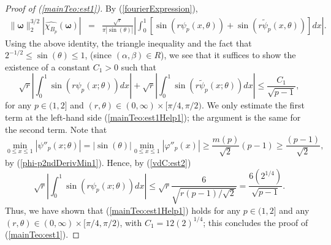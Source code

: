 \documentclass{amsart}
\numberwithin{equation}{section}
\begin{document}
\begin{proof}[Proof of (\ref{mainTeo:est1})] 
By (\ref{fourierExpression}),
\begin{eqnarray}
\nonumber
\|\boldsymbol{\omega}\|_2^{3/2}|\widehat{\chi_{B_p}}(\boldsymbol{\omega})|&=&\frac{\sqrt{r}}{\pi|\sin(\theta)|}\left|\int_0^1 \left[\sin(r\psi_p(x,\theta))+\sin(r\widetilde{\psi}_p(x,\theta))\right]dx\right|.
\end{eqnarray}
Using the above identity, the triangle inequality and the fact that $2^{-1/2}\le\sin(\theta)\le1$, (since $(\alpha,\beta)\in R$), we see that it suffices to show the existence of a constant $C_1>0$ such that
\begin{equation}
    \label{mainTeo:est1Help1}
    \sqrt{r}\left|\int_0^1\sin(r\psi_p(x;\theta))dx\right|+\sqrt{r}\left|\int_0^1\sin(r\widetilde{\psi}_p(x;\theta))dx\right|\le\frac{C_1}{\sqrt{p-1}},
\end{equation}
for any $p\in(1,2]$ and  $(r,\theta)\in(0,\infty)\times[\pi/4,\pi/2)$. We only estimate the first term at the left-hand side (\ref{mainTeo:est1Help1}); the argument is the same for the second term. Note that
$$
\min_{0\le x\le1}|\psi''_p(x;\theta)|=|\sin(\theta)|\min_{0\le x\le1}|\varphi''_p(x)|\ge\frac{m(p)}{\sqrt{2}}(p-1)\ge\frac{(p-1)}{\sqrt{2}},
$$
by (\ref{phi-p2ndDerivMin1}). Hence, by (\ref{vdC:est2})
$$
\sqrt{r}\left|\int_0^1\sin(r\psi_p(x;\theta))dx\right|\le\sqrt{r}\frac{6}{\sqrt{r(p-1)/\sqrt{2}}}=\frac{6(2^{1/4})}{\sqrt{p-1}}.
$$
Thus, we have shown that (\ref{mainTeo:est1Help1}) holds for any $p\in(1,2]$ and any $(r,\theta)\in(0,\infty)\times[\pi/4,\pi/2)$, with $C_1=12(2)^{1/4}$; this concludes the proof of (\ref{mainTeo:est1}).
\end{proof}
\end{document}

